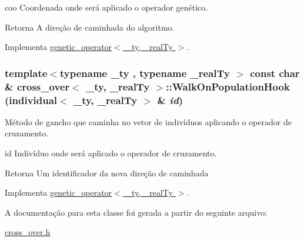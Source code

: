 coo Coordenada onde será aplicado o operador genético.

\begin{DoxyReturn}{Retorna}
A direção de caminhada do algoritmo. 
\end{DoxyReturn}


Implementa \hyperlink{classgenetic__operator_a2124d70b28b35d3114eb3e3ffa72baef}{genetic\_\-operator$<$ \_\-ty, \_\-realTy $>$}.

\hypertarget{classcross__over_a1a840a73fa36cc7f4f7e769f78d73e81}{
\subsubsection[{WalkOnPopulationHook}]{\setlength{\rightskip}{0pt plus 5cm}template$<$typename \_\-ty , typename \_\-realTy $>$ const char \& {\bf cross\_\-over}$<$ \_\-ty, \_\-realTy $>$::WalkOnPopulationHook ({\bf individual}$<$ \_\-ty, \_\-realTy $>$ \& {\em id})}}
\label{classcross__over_a1a840a73fa36cc7f4f7e769f78d73e81}
Método de gancho que caminha no vetor de indivíduos aplicando o operador de cruzamento.

id Indivíduo onde será aplicado o operador de cruzamento.

\begin{DoxyReturn}{Retorna}
Um identificador da nova direção de caminhada 
\end{DoxyReturn}


Implementa \hyperlink{classgenetic__operator_a3405bb5335111bd675d408aa8db052fa}{genetic\_\-operator$<$ \_\-ty, \_\-realTy $>$}.



A documentação para esta classe foi gerada a partir do seguinte arquivo:\begin{DoxyCompactItemize}
\item 
\hyperlink{cross__over_8h}{cross\_\-over.h}\end{DoxyCompactItemize}
